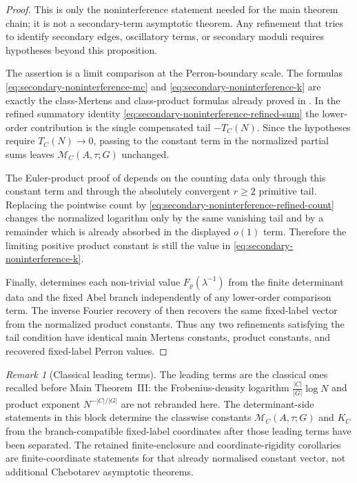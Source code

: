 \documentclass[11pt,a4paper]{amsart}
\theoremstyle{plain}
\theoremstyle{definition}
\theoremstyle{remark}
\newtheorem{remark}[theorem]{Remark}
\begin{document}
\begin{proof}
  This is only the noninterference statement needed for the main theorem chain;
  it is not a secondary-term asymptotic theorem.  Any refinement that tries to
  identify secondary edges, oscillatory terms, or secondary moduli requires
  hypotheses beyond this proposition.

  The assertion is a limit comparison at the Perron-boundary scale.  The formulas
  \eqref{eq:secondary-noninterference-mc} and
  \eqref{eq:secondary-noninterference-k} are exactly the class-Mertens and
  class-product formulas already proved in
  .  In the
  refined summatory identity \eqref{eq:secondary-noninterference-refined-sum}
  the lower-order contribution is the single compensated tail \(-T_C(N)\).
  Since the hypotheses require \(T_C(N)\to0\), passing to the constant term
  in the normalized partial sums leaves \(\mathcal M_C(A,\tau;G)\) unchanged.

  The Euler-product proof of  depends
  on the counting data only through this constant term and through the
  absolutely convergent \(r\ge2\) primitive tail.  Replacing the pointwise
  count by \eqref{eq:secondary-noninterference-refined-count} changes the
  normalized logarithm only by the same vanishing tail and by a remainder
  which is already absorbed in the displayed \(o(1)\) term.  Therefore the
  limiting positive product constant is still the value in
  \eqref{eq:secondary-noninterference-k}.

  Finally,  determines each
  non-trivial value \(F_\varrho(\lambda^{-1})\) from the finite determinant
  data and the fixed Abel branch independently of any lower-order comparison
  term.
  The inverse Fourier recovery of
   then recovers the same
  fixed-label vector from the normalized product constants.  Thus any two
  refinements satisfying the tail condition have identical main
  Mertens constants, product constants, and recovered fixed-label Perron
  values.
\end{proof}

\begin{remark}[Classical leading terms]
  \label{rem:class-mertens-comparison}
  The leading terms are the classical ones recalled before Main Theorem~III:
  the Frobenius-density logarithm
  \(\frac{|C|}{|G|}\log N\) and product exponent \(N^{-|C|/|G|}\) are not
  rebranded here.  The determinant-side statements in this block determine the
  classwise constants \(\mathcal M_C(A,\tau;G)\) and \(K_C\) from the
  branch-compatible fixed-label coordinates after those leading terms have
  been separated.  The retained finite-enclosure and coordinate-rigidity corollaries
  are finite-coordinate statements for that already normalised constant vector,
  not additional Chebotarev asymptotic theorems.
\end{remark}
\end{document}
